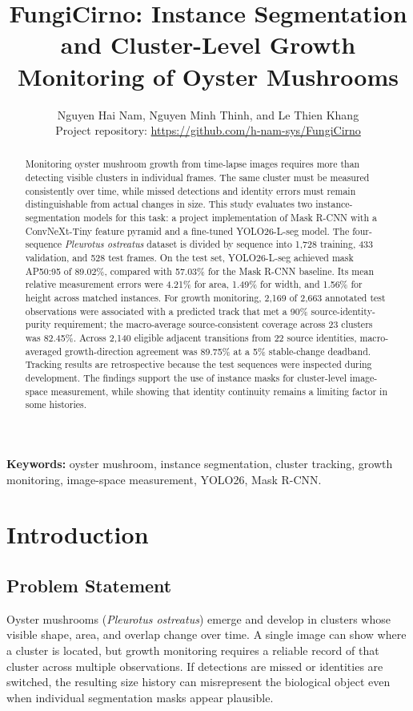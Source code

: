 \documentclass[11pt,a4paper]{article}
\title{FungiCirno: Instance Segmentation and Cluster-Level Growth Monitoring of Oyster Mushrooms}
\author{Nguyen Hai Nam, Nguyen Minh Thinh, and Le Thien Khang\\
\small Project repository: \url{https://github.com/h-nam-sys/FungiCirno}}
\date{}
\begin{document}
\maketitle

\begin{abstract}
Monitoring oyster mushroom growth from time-lapse images requires more than detecting visible clusters in individual frames. The same cluster must be measured consistently over time, while missed detections and identity errors must remain distinguishable from actual changes in size. This study evaluates two instance-segmentation models for this task: a project implementation of Mask R-CNN with a ConvNeXt-Tiny feature pyramid and a fine-tuned YOLO26-L-seg model. The four-sequence \emph{Pleurotus ostreatus} dataset is divided by sequence into 1,728 training, 433 validation, and 528 test frames. On the test set, YOLO26-L-seg achieved mask AP50:95 of 89.02\%, compared with 57.03\% for the Mask R-CNN baseline. Its mean relative measurement errors were 4.21\% for area, 1.49\% for width, and 1.56\% for height across matched instances. For growth monitoring, 2,169 of 2,663 annotated test observations were associated with a predicted track that met a 90\% source-identity-purity requirement; the macro-average source-consistent coverage across 23 clusters was 82.45\%. Across 2,140 eligible adjacent transitions from 22 source identities, macro-averaged growth-direction agreement was 89.75\% at a 5\% stable-change deadband. Tracking results are retrospective because the test sequences were inspected during development. The findings support the use of instance masks for cluster-level image-space measurement, while showing that identity continuity remains a limiting factor in some histories.
\end{abstract}

\noindent\textbf{Keywords:} oyster mushroom, instance segmentation, cluster tracking, growth monitoring, image-space measurement, YOLO26, Mask R-CNN.

\section{Introduction}

\subsection{Problem Statement}

Oyster mushrooms (\emph{Pleurotus ostreatus}) emerge and develop in clusters whose visible shape, area, and overlap change over time. A single image can show where a cluster is located, but growth monitoring requires a reliable record of that cluster across multiple observations. If detections are missed or identities are switched, the resulting size history can misrepresent the biological object even when individual segmentation masks appear plausible.
\end{document}
